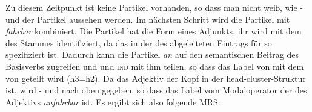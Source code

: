 Zu diesem Zeitpunkt ist keine Partikel vorhanden, so dass man nicht weiß, wie \ltop- und \indw der
Partikel aussehen werden. Im nächsten Schritt wird die Partikel mit \emph{fahrbar} kombiniert.
Die Partikel hat die Form eines Adjunkts, ihr \modw wird mit dem \synsemw
des Stammes  identifiziert, da das in der \compsl des abgeleiteten
Eintrags für   so spezifiziert ist.
Dadurch kann die Partikel \emph{an} auf den semantischen Beitrag des Basisverbs  zugreifen
und \ltopw und \textsc{ind} mit ihm teilen, so dass das Label von  mit dem
von  geteilt wird (h3=h2). Da das Adjektiv der Kopf in der head-cluster-Struktur
ist, wird \ltop- und \indw nach oben gegeben, so dass das Label vom Modaloperator der \ltopw des
Adjektivs \emph{anfahrbar} ist. Es ergibt sich also folgende MRS:
\ea
{}
\z
\iw{\bars|)}
\largerpage

